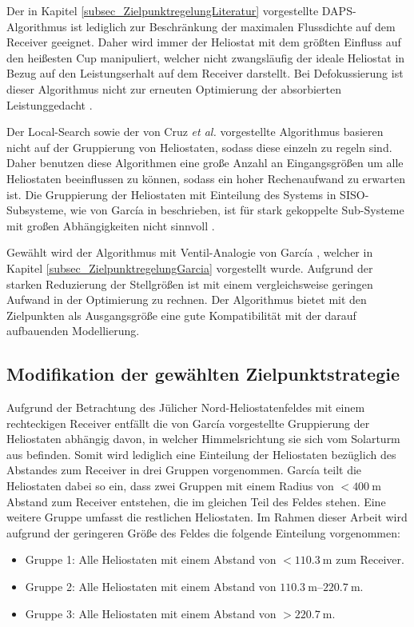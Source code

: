 Der in Kapitel \ref{subsec_ZielpunktregelungLiteratur} vorgestellte DAPS-Algorithmus \cite{VantHull2}\cite{VantHull3} ist lediglich zur Beschränkung der maximalen Flussdichte auf dem Receiver geeignet.
Daher wird immer der Heliostat mit dem größten Einfluss auf den heißesten Cup manipuliert, welcher nicht zwangsläufig der ideale Heliostat in Bezug auf den Leistungserhalt auf dem Receiver darstellt. \enlargethispage{\baselineskip}
Bei Defokussierung ist dieser Algorithmus nicht zur erneuten Optimierung der absorbierten Leistung\linebreak gedacht \cite[S.35]{DissOberkirsch}.

Der Local-Search \cite{Maldonado}\cite{Maldonado2} sowie der von Cruz \textit{et al.} \cite{Cruz} vorgestellte Algorithmus basieren nicht auf der Gruppierung von Heliostaten, sodass diese einzeln zu regeln sind.
Daher benutzen diese Algorithmen eine große Anzahl an Eingangsgrößen um alle Heliostaten beeinflussen zu können, sodass ein hoher Rechenaufwand zu erwarten ist.
Die Gruppierung der Heliostaten mit Einteilung des Systems in SISO-Subsysteme, wie von García in \cite{Garcia1} beschrieben, ist für stark gekoppelte Sub-Systeme mit großen Abhängigkeiten nicht sinnvoll \cite[S.33]{DissZanger}.

Gewählt wird der Algorithmus mit Ventil-Analogie von García \cite{Garcia2}, welcher in Kapitel \ref{subsec_ZielpunktregelungGarcia} vorgestellt wurde.
Aufgrund der starken Reduzierung der Stellgrößen ist mit einem vergleichsweise geringen Aufwand in der Optimierung zu rechnen.
Der Algorithmus bietet mit den Zielpunkten als Ausgangsgröße eine gute Kompatibilität mit der darauf aufbauenden Modellierung.


\subsection{Modifikation der gewählten Zielpunktstrategie} \label{subsec_ModifikationAlgorithmus}
Aufgrund der Betrachtung des Jülicher Nord-Heliostatenfeldes mit einem rechteckigen Receiver entfällt die von García vorgestellte Gruppierung der Heliostaten abhängig davon, in welcher Himmelsrichtung sie sich vom Solarturm aus befinden.
Somit wird lediglich eine Einteilung der Heliostaten bezüglich des Abstandes zum Receiver in drei Gruppen vorgenommen.
García teilt die Heliostaten dabei so ein, dass zwei Gruppen mit einem Radius von $< \SI{400}{\metre}$ Abstand zum Receiver entstehen, die im gleichen Teil des Feldes stehen.
Eine weitere Gruppe umfasst die restlichen Heliostaten.
Im Rahmen dieser Arbeit wird aufgrund der geringeren Größe des Feldes die folgende Einteilung vorgenommen:
\begin{itemize}
\item Gruppe 1: Alle Heliostaten mit einem Abstand von $< \SI{110.3}{\metre}$ zum Receiver.
\item Gruppe 2: Alle Heliostaten mit einem Abstand von $\SIrange{110.3}{220.7}{\metre}$.
\item Gruppe 3: Alle Heliostaten mit einem Abstand von $> \SI{220.7}{\metre}$.
\end{itemize}

